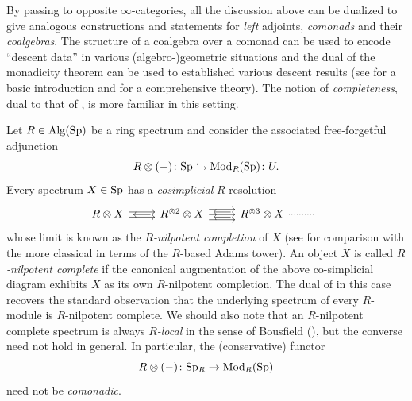 \documentclass[english]{article}
\begin{document}
By passing to opposite $\infty$-categories, all the discussion above can be dualized to give analogous constructions and statements for \textit{left} adjoints, \textit{comonads} and their \textit{coalgebras}. The structure of a coalgebra over a comonad can be used to encode ``descent data'' in various (algebro-)geometric situations and the dual of the monadicity theorem can be used to established various descent results (see \cite[Section 4.7]{borceux1994handbook} for a basic introduction and \cite[Appendix D]{SAG} for a comprehensive theory).  
The notion of \textit{completeness}, dual to that of , is more familiar in this setting.
\begin{example}\label{Nil_Completion}
     Let $R\in\operatorname{Alg}(\mathrm{Sp})$ be a ring spectrum and consider the associated free-forgetful adjunction
    \[
        R\otimes(-)\colon \mathrm{Sp} \leftrightarrows \operatorname{\operatorname{Mod}}_R(\mathrm{Sp})\colon U.
    \]
    Every spectrum $X\in\mathrm{Sp}$ has a \textit{cosimplicial} $R$-resolution
    \[
        \begin{tikzcd}
        	{R\otimes X} & {R^{\otimes 2}\otimes X} & { R^{\otimes3}\otimes X} & {{}}
        	\arrow[shift left=1, from=1-1, to=1-2]
        	\arrow[shift right=1, from=1-1, to=1-2]
        	\arrow[shorten <=4pt, shorten >=4pt, from=1-2, to=1-1]
        	\arrow[shift left=2, from=1-2, to=1-3]
        	\arrow[from=1-2, to=1-3]
        	\arrow[shift right=2, from=1-2, to=1-3]
        	\arrow[shift left=1, shorten <=4pt, shorten >=4pt, from=1-3, to=1-2]
        	\arrow[shift right=1, shorten <=4pt, shorten >=4pt, from=1-3, to=1-2]
        	\arrow[dotted, no head, from=1-3, to=1-4]
        \end{tikzcd}
    \]
    whose limit is known as the \textit{$R$-nilpotent completion} of $X$ (see \cite[Proposition 2.14]{mathew2017nilpotence} for comparison with the more classical \cite[Definition 1.3]{ravenel1984localization} in terms of the $R$-based Adams tower). An object $X$ is called \textit{$R$-nilpotent complete} if the canonical augmentation of the above co-simplicial diagram exhibits $X$ as its own $R$-nilpotent completion. The dual of  in this case recovers the standard observation that the underlying spectrum of every $R$-module is $R$-nilpotent complete. We should also note that an $R$-nilpotent complete spectrum is always \textit{$R$-local} in the sense of Bousfield (), but the converse need not hold in general. In particular, the (conservative) functor
    \[
        R\otimes(-)\colon \mathrm{Sp}{}_R \to \operatorname{\operatorname{Mod}}_R(\mathrm{Sp})
    \]
    need not be \textit{comonadic}. 
\end{example}
\end{document}
